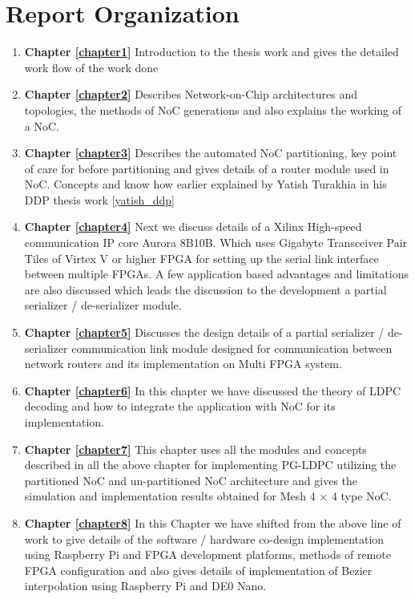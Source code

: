 \section{Report Organization}
\begin{enumerate} 
	\item{\textbf{Chapter \ref{chapter1}} Introduction to the thesis work and gives the detailed work flow of the work done}
	\item{\textbf{Chapter \ref{chapter2}} Describes Network-on-Chip architectures and topologies, the methods of NoC generations and also explains the working of a NoC.}
	\item{\textbf{Chapter \ref{chapter3}} Describes the automated NoC partitioning, key point of care for before partitioning and gives details of a router module used in NoC. Concepts and know how earlier explained by Yatish Turakhia in his DDP thesis work \ref{yatish_ddp}}
	\item{\textbf{Chapter \ref{chapter4}} Next we discuss details of a Xilinx High-speed communication IP core Aurora 8B10B. Which uses Gigabyte Transceiver Pair Tiles of Virtex V or higher FPGA for setting up the serial link interface between multiple FPGAs. A few application based advantages and limitations are also discussed which leads the discussion to the development a partial serializer / de-serializer module.}
	\item{\textbf{Chapter \ref{chapter5}} Discusses the design details of a partial serializer / de-serializer communication link module designed for communication between network routers and its implementation on Multi FPGA system.}
	\item{\textbf{Chapter \ref{chapter6}} In this chapter we have discussed the theory of LDPC decoding and how to integrate the application with NoC for its implementation.}
	\item{\textbf{Chapter \ref{chapter7}}  This chapter uses all the modules and concepts described in all the above chapter for implementing PG-LDPC utilizing the partitioned NoC and un-partitioned NoC architecture and gives the simulation and implementation results obtained for Mesh 4 $\times$ 4 type NoC.}
	\item{\textbf{Chapter \ref{chapter8}} In this Chapter we have shifted from the above line of work to give details of the software / hardware co-design implementation using Raspberry Pi and FPGA development platforms, methods of remote FPGA configuration and also gives details of implementation of Bezier interpolation using Raspberry Pi and DE0 Nano.}

\end{enumerate}

